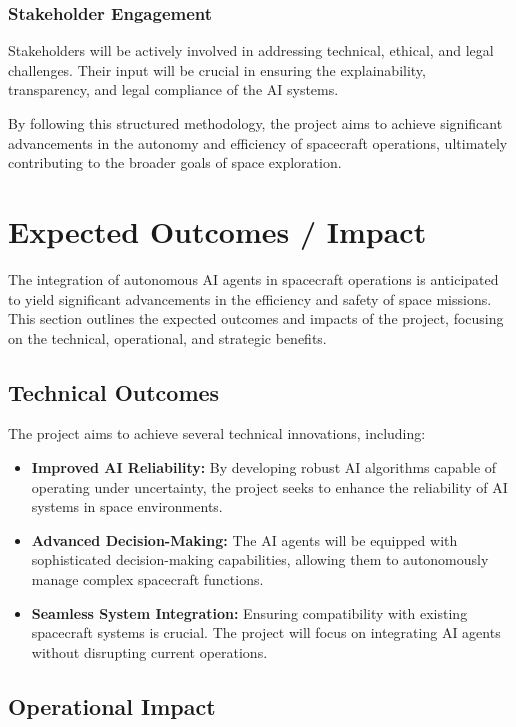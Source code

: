 \documentclass[a4paper, 11pt]{article}
\begin{document}
\subsubsection{Stakeholder Engagement}

Stakeholders will be actively involved in addressing technical, ethical, and legal challenges. Their input will be crucial in ensuring the explainability, transparency, and legal compliance of the AI systems.

By following this structured methodology, the project aims to achieve significant advancements in the autonomy and efficiency of spacecraft operations, ultimately contributing to the broader goals of space exploration.
\section{Expected Outcomes / Impact}

The integration of autonomous AI agents in spacecraft operations is anticipated to yield significant advancements in the efficiency and safety of space missions. This section outlines the expected outcomes and impacts of the project, focusing on the technical, operational, and strategic benefits.

\subsection{Technical Outcomes}

The project aims to achieve several technical innovations, including:

\begin{itemize}
    \item \textbf{Improved AI Reliability:} By developing robust AI algorithms capable of operating under uncertainty, the project seeks to enhance the reliability of AI systems in space environments.
    \item \textbf{Advanced Decision-Making:} The AI agents will be equipped with sophisticated decision-making capabilities, allowing them to autonomously manage complex spacecraft functions.
    \item \textbf{Seamless System Integration:} Ensuring compatibility with existing spacecraft systems is crucial. The project will focus on integrating AI agents without disrupting current operations.
\end{itemize}

\subsection{Operational Impact}
\end{document}
